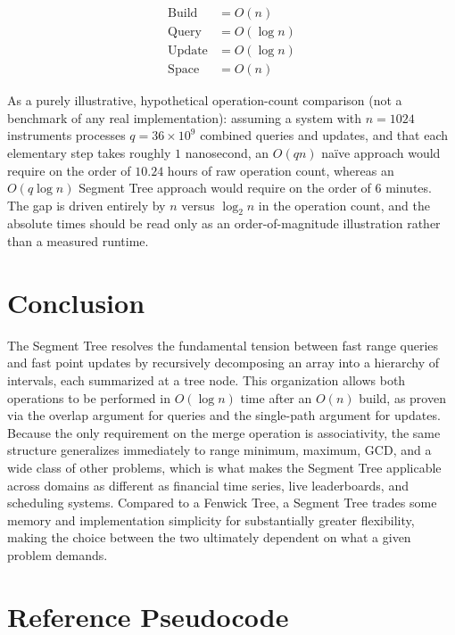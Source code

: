 \documentclass[11pt,open=any,headings=option]{scrreprt}
\begin{document}
\begin{equation}
\boxed{
\begin{aligned}
\text{Build} &= O(n) \\
\text{Query} &= O(\log n) \\
\text{Update} &= O(\log n) \\
\text{Space} &= O(n)
\end{aligned}}
\end{equation}

As a purely illustrative, hypothetical operation-count comparison (not a benchmark of any real implementation): assuming a system with $n = 1024$ instruments processes $q = 36 \times 10^9$ combined queries and updates, and that each elementary step takes roughly $1$ nanosecond, an $O(qn)$ na\"ive approach would require on the order of $10.24$ hours of raw operation count, whereas an $O(q \log n)$ Segment Tree approach would require on the order of $6$ minutes. The gap is driven entirely by $n$ versus $\log_2 n$ in the operation count, and the absolute times should be read only as an order-of-magnitude illustration rather than a measured runtime.

\chapter{Conclusion}

The Segment Tree resolves the fundamental tension between fast range queries and fast point updates by recursively decomposing an array into a hierarchy of intervals, each summarized at a tree node. This organization allows both operations to be performed in $O(\log n)$ time after an $O(n)$ build, as proven via the overlap argument for queries and the single-path argument for updates. Because the only requirement on the merge operation is associativity, the same structure generalizes immediately to range minimum, maximum, GCD, and a wide class of other problems, which is what makes the Segment Tree applicable across domains as different as financial time series, live leaderboards, and scheduling systems. Compared to a Fenwick Tree, a Segment Tree trades some memory and implementation simplicity for substantially greater flexibility, making the choice between the two ultimately dependent on what a given problem demands.

\appendix
\chapter{Reference Pseudocode}
\end{document}
